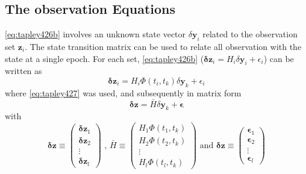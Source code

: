 \subsection{The observation Equations}\label{ssec:pod-observation-equations}

\autoref{eq:tapley426b} involves an unknown state vector $\delta \bm{y}_i$ related 
to the observation set $\bm{z}_i$. The state transition matrix can be used to relate 
all observation with the state at a single epoch. For each set, \autoref{eq:tapley426b} 
($\bm{\delta z}_i = H_i \delta \bm{y}_i + \epsilon _i$) can be written as 
\begin{equation}\label{eq:tapley4237}
    \bm{\delta z}_i = H_i \Phi (t_i,t_k) \delta \bm{y}_k + \epsilon _i
\end{equation}
where \autoref{eq:tapley427} was used, and subsequently in matrix form 
\begin{equation}\label{eq:tapley4239}
    \bm{\delta z} = \bar{H} \delta \bm{y}_k + \bm{\epsilon}
\end{equation}
with
\begin{equation}
    \bm{\delta z} \equiv \begin{pmatrix}\bm{\delta z}_1 \\ \bm{\delta z}_2 \\ \vdots \\ \bm{\delta z}_l \end{pmatrix} 
    \text{ , }
    \bar{H} \equiv \begin{pmatrix}H_1 \Phi (t_1,t_k) \\ H_2 \Phi (t_2,t_k) \\ \vdots \\ H_l \Phi (t_l,t_k)\end{pmatrix} 
    \text{ and }
    \bm{\delta z} \equiv \begin{pmatrix}\bm{\epsilon}_1 \\ \bm{\epsilon}_2 \\ \vdots \\ \bm{\epsilon}_l \end{pmatrix} 
\end{equation}
